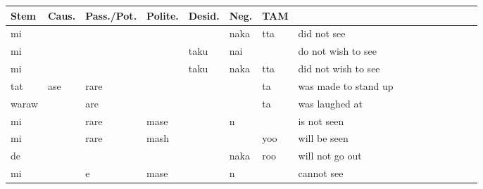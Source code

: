 \documentclass[11pt,letterpaper]{article}
\begin{document}
	\begin{center}
\begin{tabular}{lllllllll|lllllll}
Stem & Caus. & Pass./Pot. & Polite. & Desid. & Neg. & TAM & \\ \hline
mi &          &       &            &          & naka     & tta    & did not see \cite[153]{vaccari1938complete}\\
mi &          &       &            & taku     & nai      &         & do not wish to see \cite[98]{vaccari1938complete} \\
mi &          &       &            & taku     & naka    & tta       & did not wish to see \cite[98]{vaccari1938complete} \\
tat & ase     & rare  &            &          &         & ta         & was made to stand up \cite[396]{kaiser2013japanese} \\
waraw  &       & are  &            &           &         & ta        & was laughed at \cite[384]{kaiser2013japanese} \\
mi     &       & rare & mase       &          & n        &           & is not seen \cite[337]{vaccari1938complete} \\
mi     &       & rare & mash      &           &          & yoo      & will be seen \cite[337]{vaccari1938complete} \\
de     &       &     &            &           & naka     & roo      & will not go out \cite[170]{vaccari1938complete} \\
mi     &       &     e & mase       &           & n        &          & cannot see \cite[349]{vaccari1938complete} \\
\end{tabular}
	\end{center}



\end{document}
